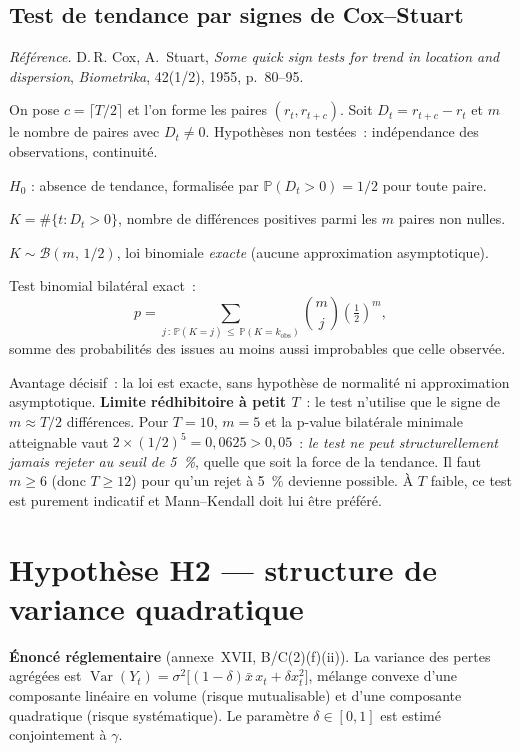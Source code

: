 \documentclass[a4paper,11pt]{article}
\newcommand{\refl}[1]{{\small\textcolor{maincolor!70!black}{\textit{Référence.} #1}}\par\smallskip}
\newcounter{ficheid}
\newenvironment{fiche}[1]{%
  \stepcounter{ficheid}%
  \phantomsection
  \subsection{#1}%
  \label{fiche:\theficheid}%
}{%
  \end{description}\vspace{0.5em}%
}
\newcommand{\Cadre}{%
  \begin{description}[leftmargin=0pt, style=unboxed, itemsep=3pt, topsep=3pt, parsep=2pt]%
  \item[\textcolor{financeblue}{\textbf{1. Cadre, notations et hypothèses de validité (non testées).}}]}
\newcommand{\Hzero}{\item[\textcolor{financeblue}{\textbf{2. Hypothèse nulle.}}]}
\newcommand{\Stat}{\item[\textcolor{financeblue}{\textbf{3. Statistique de test.}}]}
\newcommand{\Loi}{\item[\textcolor{financeblue}{\textbf{4. Loi sous $H_0$.}}]}
\newcommand{\Pval}{\item[\textcolor{financeblue}{\textbf{5. p-value.}}]}
\newcommand{\Usage}{\item[\textcolor{financeblue}{\textbf{6. Usage et limites.}}]}
\begin{document}
\begin{fiche}{Test de tendance par signes de Cox--Stuart}
\refl{D.\,R. Cox, A.~Stuart, \emph{Some quick sign tests for trend in location and dispersion},
\emph{Biometrika}, 42(1/2), 1955, p.~80--95.}
\Cadre
On pose $c = \lceil T/2 \rceil$ et l'on forme les paires $(r_t, r_{t+c})$. Soit
$D_t = r_{t+c} - r_t$ et $m$ le nombre de paires avec $D_t \neq 0$. Hypothèses non testées~:
indépendance des observations, continuité.
\Hzero
$H_0$ : absence de tendance, formalisée par $\mathbb{P}(D_t > 0) = 1/2$ pour toute paire.
\Stat
$K = \#\{t : D_t > 0\}$, nombre de différences positives parmi les $m$ paires non nulles.
\Loi
$K \sim \mathcal{B}(m,\,1/2)$, loi binomiale \emph{exacte} (aucune approximation asymptotique).
\Pval
Test binomial bilatéral exact~:
\[
  p = \sum_{j\,:\,\mathbb{P}(K=j)\,\le\,\mathbb{P}(K=k_{\text{obs}})} \binom{m}{j}\left(\tfrac12\right)^{m},
\]
somme des probabilités des issues au moins aussi improbables que celle observée.
\Usage
Avantage décisif~: la loi est exacte, sans hypothèse de normalité ni approximation asymptotique.
\textbf{Limite rédhibitoire à petit $T$}~: le test n'utilise que le signe de $m \approx T/2$
différences. Pour $T = 10$, $m = 5$ et la p-value bilatérale minimale atteignable vaut
$2 \times (1/2)^5 = 0{,}0625 > 0{,}05$~: \emph{le test ne peut structurellement jamais rejeter au
seuil de 5~\%}, quelle que soit la force de la tendance. Il faut $m \ge 6$ (donc $T \ge 12$) pour
qu'un rejet à 5~\% devienne possible. À $T$ faible, ce test est purement indicatif et
Mann--Kendall doit lui être préféré.
\end{fiche}

\newpage
\clearpage
\section{Hypothèse H2 --- structure de variance quadratique}

\begin{encadre}
\textbf{Énoncé réglementaire} (annexe~XVII, B/C(2)(f)(ii)). La variance des pertes agrégées est
$\operatorname{Var}(Y_t) = \sigma^2\big[(1-\delta)\bar x\, x_t + \delta x_t^2\big]$, mélange
convexe d'une composante linéaire en volume (risque mutualisable) et d'une composante quadratique
(risque systématique). Le paramètre $\delta \in [0,1]$ est estimé conjointement à $\gamma$.
\end{encadre}
\end{document}
